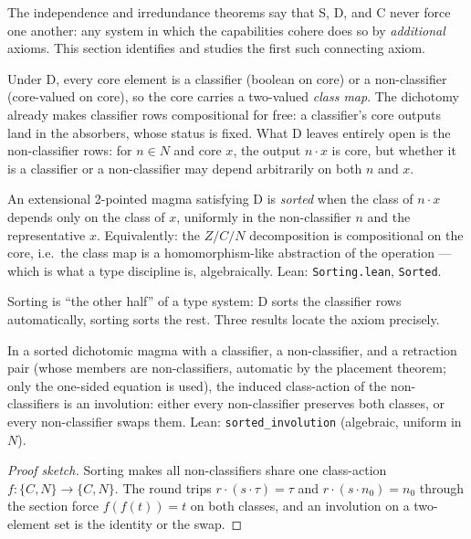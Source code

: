 \documentclass[sigconf,screen]{acmart}
\newcommand{\dotop}{\cdot}
\theoremstyle{remark}
\begin{document}
The independence and irredundance theorems say that S, D, and C never force one another: any system in which the capabilities cohere does so by \emph{additional} axioms. This section identifies and studies the first such connecting axiom.

Under D, every core element is a classifier (boolean on core) or a non-classifier (core-valued on core), so the core carries a two-valued \emph{class map}. The dichotomy already makes classifier rows compositional for free: a classifier's core outputs land in the absorbers, whose status is fixed. What D leaves entirely open is the non-classifier rows: for $n \in N$ and core $x$, the output $n \dotop x$ is core, but whether it is a classifier or a non-classifier may depend arbitrarily on both $n$ and $x$.

\begin{definition}[Sorting]
\label{def:sorting}
An extensional 2-pointed magma satisfying D is \emph{sorted} when the class of $n \dotop x$ depends only on the class of $x$, uniformly in the non-classifier $n$ and the representative $x$. Equivalently: the $Z/C/N$ decomposition is compositional on the core, i.e.\ the class map is a homomorphism-like abstraction of the operation --- which is what a type discipline is, algebraically. Lean: \texttt{Sorting.lean}, \texttt{Sorted}.
\end{definition}

Sorting is ``the other half'' of a type system: D sorts the classifier rows automatically, sorting sorts the rest. Three results locate the axiom precisely.

\begin{theorem}
\label{thm:sorted-involution}
In a sorted dichotomic magma with a classifier, a non-classifier, and a retraction pair (whose members are non-classifiers, automatic by the placement theorem; only the one-sided equation is used), the induced class-action of the non-classifiers is an involution: either every non-classifier preserves both classes, or every non-classifier swaps them. Lean: \texttt{sorted\_involution} (algebraic, uniform in $N$).
\end{theorem}

\begin{proof}[Proof sketch]
Sorting makes all non-classifiers share one class-action $f : \{C, N\} \to \{C, N\}$. The round trips $r \dotop (s \dotop \tau) = \tau$ and $r \dotop (s \dotop n_0) = n_0$ through the section force $f(f(t)) = t$ on both classes, and an involution on a two-element set is the identity or the swap.
\end{proof}
\end{document}
